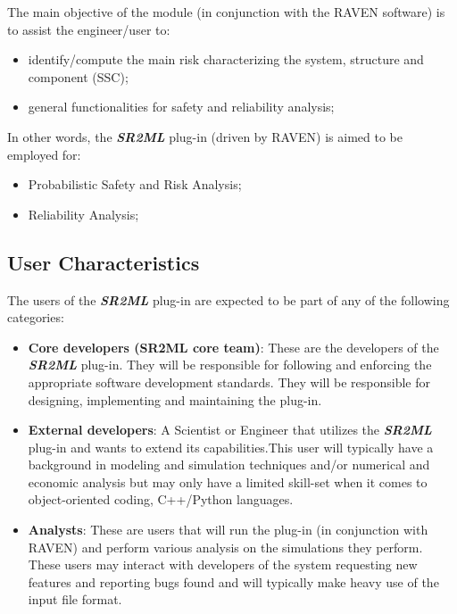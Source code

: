  The main objective of the module (in conjunction with the RAVEN software) is to assist the engineer/user to:
\begin{itemize}
  \item identify/compute the main risk characterizing the system, structure and component (SSC);
  \item general functionalities for safety and reliability analysis;
\end{itemize}

In other words, the  \textbf{\textit{SR2ML}} plug-in (driven by RAVEN) is aimed to be employed for:
\begin{itemize}
  \item Probabilistic Safety and Risk Analysis;
  \item Reliability Analysis;
\end{itemize}


\subsection{User Characteristics}

The users of the \textbf{\textit{SR2ML}} plug-in are expected to be part of any of the
following categories:
\begin{itemize}
  \item \textbf{Core developers (SR2ML core team)}: These are the developers of the \textbf{\textit{SR2ML}}  plug-in. They will be responsible for following
    and enforcing the appropriate software development standards. They will be responsible for designing, implementing and
    maintaining the plug-in.
  \item \textbf{External developers}: A Scientist or Engineer that utilizes the \textbf{\textit{SR2ML}}  plug-in and wants to extend its
  capabilities.This user will typically have a background in modeling and
simulation techniques and/or numerical and economic analysis but may only have a limited skill-set when it comes to object-oriented
coding, C++/Python languages.
  \item \textbf{Analysts}:  These are users that will run the plug-in (in conjunction with RAVEN) and perform various analysis on the
  simulations they perform. These users may interact with developers of the system requesting new features and reporting bugs found
  and will typically make heavy use of the input file format.
\end{itemize}
